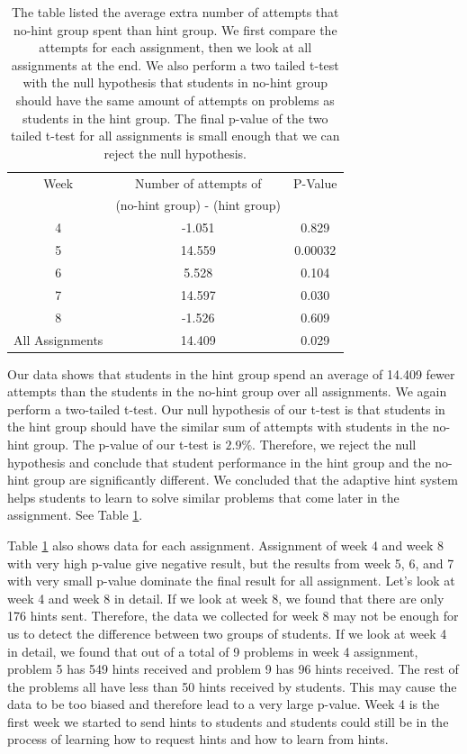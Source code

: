 \documentclass{llncs}
\begin{document}
\begin{table}
\caption{The table listed the average extra number of attempts that no-hint group spent than hint group. We first compare the attempts for each assignment, then we look at all assignments at the end. We also perform a two tailed t-test with the null hypothesis that students in no-hint group should have the same amount of attempts on problems as students in the hint group. The final p-value of the two tailed t-test for all assignments is small enough that we can reject the null hypothesis.}

\begin{center}
  \begin{tabular}{| c | c | c |}
  \hline
   Week & Number of attempts of & P-Value \\
      & (no-hint group) - (hint group)  & \\ \hline
	4 & -1.051 & 0.829 \\
	5 & 14.559 & 0.00032 \\
	6 & 5.528 & 0.104 \\
	7 & 14.597 & 0.030 \\
	8 & -1.526 & 0.609 \\ \hline
    All Assignments & 14.409 & 0.029 \\ 
    \hline
  \end{tabular}
  \label{tab:no_hint}
  \end{center}
\end{table}

Our data shows that students in the hint group spend an average of 14.409 fewer attempts than the students in the no-hint group over all assignments. We again perform a two-tailed t-test. Our null hypothesis of our t-test is that students in the hint group should have the similar sum of attempts with students in the no-hint group. The p-value of our t-test is $2.9\%$. Therefore, we reject the null hypothesis and conclude that student performance in the hint group and the no-hint group are significantly different. We concluded that the adaptive hint system helps students to learn to solve similar problems that come later in the assignment. See Table \ref{tab:no_hint}.

Table \ref{tab:no_hint} also shows data for each assignment. Assignment of week 4 and week 8 with very high p-value give negative result, but the results from week 5, 6, and 7 with very small p-value dominate the final result for all assignment. Let's look at week 4 and week 8 in detail. If we look at week 8, we found that there are only 176 hints sent. Therefore, the data we collected for week 8 may not be enough for us to detect the difference between two groups of students. If we look at week 4 in detail, we found that out of a total of 9 problems in week 4 assignment, problem 5 has 549 hints received and problem 9 has 96 hints received. The rest of the problems all have less than 50 hints received by students. This may cause the data to be too biased and therefore lead to a very large p-value. Week 4 is the first week we started to send hints to students and students could still be in the process of learning how to request hints and how to learn from hints.
\end{document}
